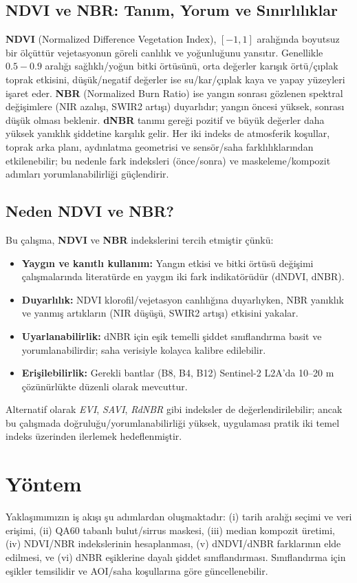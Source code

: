 \documentclass[11pt,a4paper]{article}
\begin{document}
\subsection*{NDVI ve NBR: Tanım, Yorum ve Sınırlılıklar}
\textbf{NDVI} (Normalized Difference Vegetation Index), \([-1,1]\) aralığında
boyutsuz bir ölçüttür vejetasyonun göreli canlılık ve yoğunluğunu yansıtır.
Genellikle \(0.5{-}0.9\) aralığı sağlıklı/yoğun bitki örtüsünü, orta değerler karışık
örtü/çıplak toprak etkisini, düşük/negatif değerler ise su/kar/çıplak kaya ve yapay
yüzeyleri işaret eder. \textbf{NBR} (Normalized Burn Ratio) ise yangın sonrası
gözlenen spektral değişimlere (NIR azalışı, SWIR2 artışı) duyarlıdır; yangın öncesi
yüksek, sonrası düşük olması beklenir. \textbf{dNBR} tanımı gereği pozitif ve büyük
değerler daha yüksek yanıklık şiddetine karşılık gelir. Her iki indeks de atmosferik
koşullar, toprak arka planı, aydınlatma geometrisi ve sensör/saha farklılıklarından
etkilenebilir; bu nedenle fark indeksleri (önce/sonra) ve maskeleme/kompozit adımları
yorumlanabilirliği güçlendirir.

\subsection*{Neden NDVI ve NBR?}
Bu çalışma, \textbf{NDVI} ve \textbf{NBR} indekslerini tercih etmiştir çünkü:
\begin{itemize}
  \item \textbf{Yaygın ve kanıtlı kullanım:} Yangın etkisi ve bitki örtüsü değişimi çalışmalarında literatürde en yaygın iki fark indikatörüdür (dNDVI, dNBR).
  \item \textbf{Duyarlılık:} NDVI klorofil/vejetasyon canlılığına duyarlıyken, NBR yanıklık ve yanmış artıkların (NIR düşüşü, SWIR2 artışı) etkisini yakalar.
  \item \textbf{Uyarlanabilirlik:} dNBR için eşik temelli şiddet sınıflandırma basit ve yorumlanabilirdir; saha verisiyle kolayca kalibre edilebilir.
  \item \textbf{Erişilebilirlik:} Gerekli bantlar (B8, B4, B12) Sentinel-2 L2A'da 10--20 m çözünürlükte düzenli olarak mevcuttur.
\end{itemize}
Alternatif olarak \emph{EVI}, \emph{SAVI}, \emph{RdNBR} gibi indeksler de değerlendirilebilir; ancak bu çalışmada doğruluğu/yorumlanabilirliği yüksek, uygulaması pratik iki temel indeks üzerinden ilerlemek hedeflenmiştir.

\section{Yöntem}
Yaklaşımımızın iş akışı şu adımlardan oluşmaktadır: (i) tarih aralığı seçimi ve veri
erişimi, (ii) QA60 tabanlı bulut/sirrus maskesi, (iii) median kompozit üretimi,
(iv) NDVI/NBR indekslerinin hesaplanması, (v) dNDVI/dNBR farklarının elde edilmesi,
ve (vi) dNBR eşiklerine dayalı şiddet sınıflandırması. Sınıflandırma için eşikler
temsilidir ve AOI/saha koşullarına göre güncellenebilir.
\end{document}
